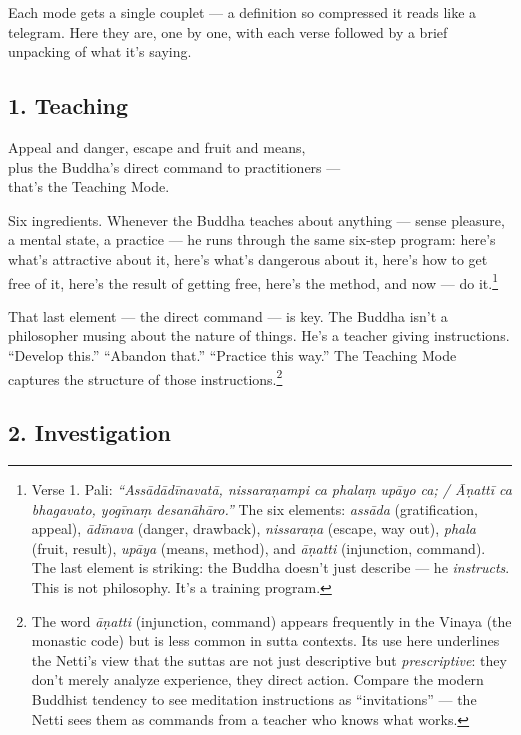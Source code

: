 Each mode gets a single couplet --- a definition so compressed it reads like a telegram. Here they are, one by one, with each verse followed by a brief unpacking of what it's saying.

\bigskip

\subsection*{1. Teaching}

\begin{versebox}
Appeal and danger, escape and fruit and means,\\
plus the Buddha's direct command to practitioners ---\\
that's the Teaching Mode.
\end{versebox}

Six ingredients. Whenever the Buddha teaches about anything --- sense pleasure, a mental state, a practice --- he runs through the same six-step program: here's what's attractive about it, here's what's dangerous about it, here's how to get free of it, here's the result of getting free, here's the method, and now --- do it.\footnote{Verse 1. Pali: \textit{``Assādādīnavatā, nissaraṇampi ca phalaṃ upāyo ca; / Āṇattī ca bhagavato, yogīnaṃ desanāhāro.''} The six elements: \textit{assāda} (gratification, appeal), \textit{ādīnava} (danger, drawback), \textit{nissaraṇa} (escape, way out), \textit{phala} (fruit, result), \textit{upāya} (means, method), and \textit{āṇatti} (injunction, command). The last element is striking: the Buddha doesn't just describe --- he \textit{instructs}. This is not philosophy. It's a training program.}

That last element --- the direct command --- is key. The Buddha isn't a philosopher musing about the nature of things. He's a teacher giving instructions. ``Develop this.'' ``Abandon that.'' ``Practice this way.'' The Teaching Mode captures the structure of those instructions.\footnote{The word \textit{āṇatti} (injunction, command) appears frequently in the Vinaya (the monastic code) but is less common in sutta contexts. Its use here underlines the Netti's view that the suttas are not just descriptive but \textit{prescriptive}: they don't merely analyze experience, they direct action. Compare the modern Buddhist tendency to see meditation instructions as ``invitations'' --- the Netti sees them as commands from a teacher who knows what works.}

\subsection*{2. Investigation}

